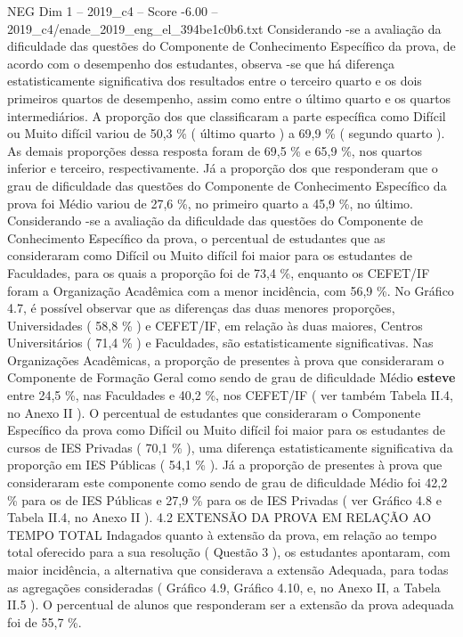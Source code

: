 \begin{textsample}{NEG Dim 1 – 2019\_c4 – Score -6.00 – 2019\_c4/enade\_2019\_eng\_el\_394be1c0b6.txt}
Considerando -se a avaliação da dificuldade das questões do Componente de Conhecimento Específico da prova, de acordo com o desempenho dos estudantes, observa -se que há diferença estatisticamente significativa dos resultados entre o terceiro quarto e os dois primeiros quartos de desempenho, assim como entre o último quarto e os quartos intermediários.
A proporção dos que classificaram a parte específica como Difícil ou Muito difícil variou de 50,3 \% ( último quarto ) a 69,9 \% ( segundo quarto ).
As demais proporções dessa resposta foram de 69,5 \% e 65,9 \%, nos quartos inferior e terceiro, respectivamente.
Já a proporção dos que responderam que o grau de dificuldade das questões do Componente de Conhecimento Específico da prova foi Médio variou de 27,6 \%, no primeiro quarto a 45,9 \%, no último.
Considerando -se a avaliação da dificuldade das questões do Componente de Conhecimento Específico da prova, o percentual de estudantes que as consideraram como Difícil ou Muito difícil foi maior para os estudantes de Faculdades, para os quais a proporção foi de 73,4 \%, enquanto os CEFET/IF foram a Organização Acadêmica com a menor incidência, com 56,9 \%.
No Gráfico 4.7, é possível observar que as diferenças das duas menores proporções, Universidades ( 58,8 \% ) e CEFET/IF, em relação às duas maiores, Centros Universitários ( 71,4 \% ) e Faculdades, são estatisticamente significativas.
Nas Organizações Acadêmicas, a proporção de presentes à prova que consideraram o Componente de Formação Geral como sendo de grau de dificuldade Médio \textbf{esteve} entre 24,5 \%, nas Faculdades e 40,2 \%, nos CEFET/IF ( ver também Tabela II.4, no Anexo II ).
O percentual de estudantes que consideraram o Componente Específico da prova como Difícil ou Muito difícil foi maior para os estudantes de cursos de IES Privadas ( 70,1 \% ), uma diferença estatisticamente significativa da proporção em IES Públicas ( 54,1 \% ).
Já a proporção de presentes à prova que consideraram este componente como sendo de grau de dificuldade Médio foi 42,2 \% para os de IES Públicas e 27,9 \% para os de IES Privadas ( ver Gráfico 4.8 e Tabela II.4, no Anexo II ). 4.2 EXTENSÃO DA PROVA EM RELAÇÃO AO TEMPO TOTAL Indagados quanto à extensão da prova, em relação ao tempo total oferecido para a sua resolução ( Questão 3 ), os estudantes apontaram, com maior incidência, a alternativa que considerava a extensão Adequada, para todas as agregações consideradas ( Gráfico 4.9, Gráfico 4.10, e, no Anexo II, a Tabela II.5 ).
O percentual de alunos que responderam ser a extensão da prova adequada foi de 55,7 \%.

\end{textsample}
